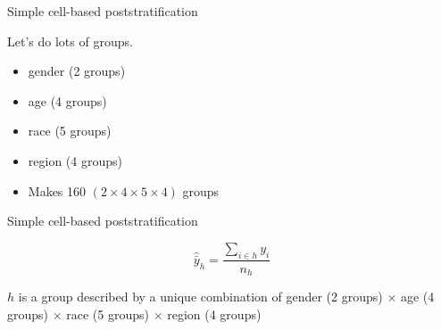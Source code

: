 \documentclass[aspectratio=169]{beamer}
\begin{document}
%
%
%
%
\begin{frame}{Simple cell-based poststratification}

Let's do lots of groups.
\begin{itemize}
\item gender (2 groups)
\item age (4 groups)
\item race (5 groups)
\item region (4 groups)
\item Makes 160 $(2 \times 4 \times 5 \times 4)$ groups
\end{itemize}

\end{frame}
\begin{frame}{Simple cell-based poststratification}

\begin{equation*}
\hat{\bar{y}}_h = \frac{\sum_{i \in h} y_i}{n_h}
\end{equation*}

\vfill
$h$ is a group described by a unique combination of gender (2 groups) $\times$ age (4 groups) $\times$ race (5 groups) $\times$ region (4 groups) 

\end{frame}
\end{document}
